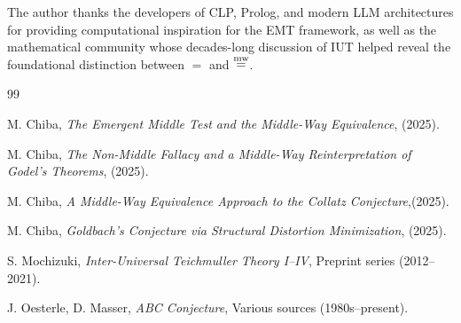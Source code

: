\documentclass[11pt]{article}
\begin{document}
The author thanks the developers of CLP, Prolog, and modern LLM
architectures for providing computational inspiration for the EMT
framework, as well as the mathematical community whose decades-long
discussion of IUT helped reveal the foundational distinction between $=$
and $\mathrel{\overset{\mathrm{mw}}{=}}$.

\begin{thebibliography}{99}

M. Chiba,
\textit{The Emergent Middle Test and the Middle-Way Equivalence}, (2025).

M. Chiba,
\textit{The Non-Middle Fallacy and a Middle-Way Reinterpretation of
Godel's Theorems}, (2025).

M. Chiba,
\textit{A Middle-Way Equivalence Approach to the Collatz Conjecture},(2025).

M. Chiba,
\textit{Goldbach's Conjecture via Structural Distortion Minimization}, (2025).

S. Mochizuki,
\textit{Inter-Universal Teichmuller Theory I--IV},
Preprint series (2012--2021).

J. Oesterle, D. Masser,
\textit{ABC Conjecture},
Various sources (1980s--present).

\end{thebibliography}
\end{document}
